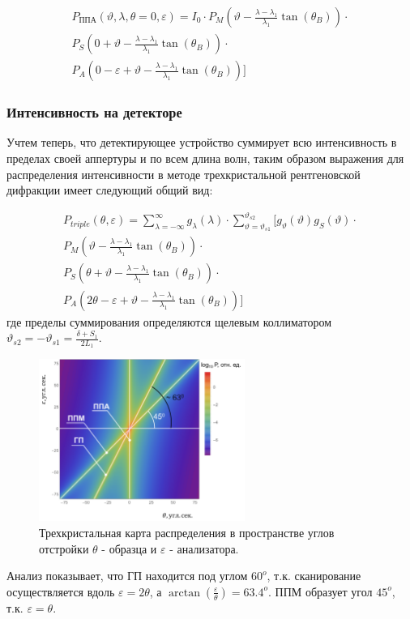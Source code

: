  \begin{eqnarray} \label{eq:triplr_spectra_angle_map_PPM}
   P_{\text{ППА}}(\vartheta,\lambda,\theta=0,\varepsilon) =I_0\cdot
     P_M \left(\vartheta - \frac{\lambda - \lambda_1}{\lambda_1}\tan(\theta_B) \right) \cdot \nonumber \\
    P_S \left(0 + \vartheta - \frac{\lambda - \lambda_1}{\lambda_1}\tan(\theta_B)\right)  \cdot  \nonumber \\
    P_A \left(0-\varepsilon  + \vartheta - \frac{\lambda - \lambda_1}{\lambda_1}\tan(\theta_B)\right) \Bigg]
  \end{eqnarray}


\subsubsection*{Интенсивность на детекторе}

Учтем теперь, что детектирующее устройство суммирует всю интенсивность в пределах своей аппертуры и по всем длина волн,
таким образом выражения для распределения интенсивности в методе трехкристальной рентгеновской дифракции имеет следующий
общий вид:

\begin{eqnarray} \label{eq:doudle_spectra_angle}
  P_{triple}(\theta,\varepsilon) = \sum_{\lambda = -\infty}^{\infty}g_{\lambda}(\lambda)\cdot
  \sum_{\vartheta = \vartheta_{s1}}^{\vartheta_{s2}} \Bigg[ g_{\vartheta}(\vartheta) g_{S}(\vartheta) \cdot \nonumber \\
    P_M \left(\vartheta - \frac{\lambda - \lambda_1}{\lambda_1}\tan(\theta_B) \right) \cdot \nonumber \\
   P_S \left(\theta + \vartheta - \frac{\lambda - \lambda_1}{\lambda_1}\tan(\theta_B)\right)  \cdot  \nonumber \\
   P_A \left(2\theta - \varepsilon + \vartheta - \frac{\lambda - \lambda_1}{\lambda_1}\tan(\theta_B)\right) \Bigg]
 \end{eqnarray}
где пределы суммирования определяются щелевым коллиматором $\vartheta_{s2} = - \vartheta_{s1} = \frac{\delta+S_1}{2L_1}$.
 \begin{figure}[H]
   \centering
   \includegraphics[width=0.6\textwidth]{images/triple_map_direct_space.png}
   \caption{Трехкристальная карта распределения в пространстве углов отстройки $\theta$ - образца и $\varepsilon$
   -  анализатора.}
   \label{ris:triple_map_direct_space}
 \end{figure}

Анализ показывает, что ГП находится под углом $60^o$, т.к. сканирование осуществляется вдоль $\varepsilon = 2 \theta$,
а $ \arctan \left(\frac{\varepsilon}{\theta} \right) = 63.4^o$. ППМ образует угол $45^o$, т.к. $\varepsilon = \theta$.
